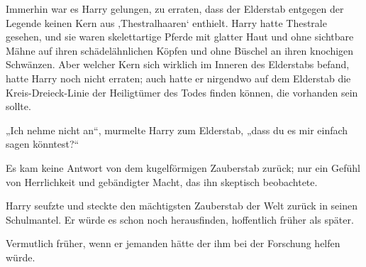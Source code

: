 Immerhin war es Harry gelungen, zu erraten, dass der Elderstab entgegen der Legende keinen Kern aus ‚Thestralhaaren‘ enthielt. Harry hatte Thestrale gesehen, und sie waren skelettartige Pferde mit glatter Haut und ohne sichtbare Mähne auf ihren schädelähnlichen Köpfen und ohne Büschel an ihren knochigen Schwänzen. Aber welcher Kern sich wirklich im Inneren des Elderstabs befand, hatte Harry noch nicht erraten; auch hatte er nirgendwo auf dem Elderstab die Kreis-Dreieck-Linie der Heiligtümer des Todes finden können, die vorhanden sein sollte.

„Ich nehme nicht an“, murmelte Harry zum Elderstab, „dass du es mir einfach sagen könntest?“

Es kam keine Antwort von dem kugelförmigen Zauberstab zurück; nur ein Gefühl von Herrlichkeit und gebändigter Macht, das ihn skeptisch beobachtete.

Harry seufzte und steckte den mächtigsten Zauberstab der Welt zurück in seinen Schulmantel. Er würde es schon noch herausfinden, hoffentlich früher als später.

Vermutlich früher, wenn er jemanden hätte der ihm bei der Forschung helfen würde.

